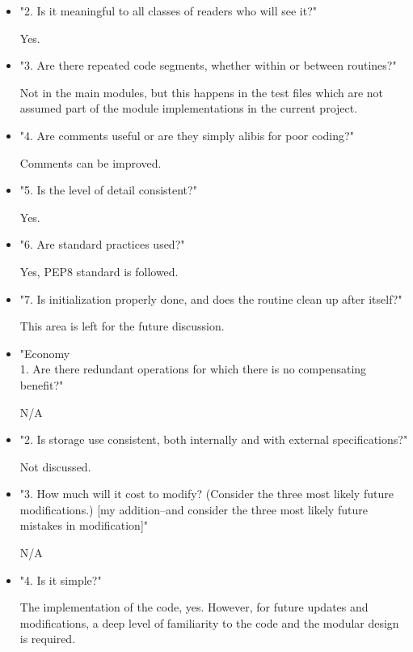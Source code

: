 \documentclass[12pt, titlepage]{article}
\begin{document}
\begin{itemize}
	\item "2.  Is it meaningful to all classes of readers who will see it?"
	
	\subitem Yes.
	
	\item "3.  Are there repeated code segments, whether within or between
	routines?"
	
	\subitem Not in the main modules, but this happens in the test files which are not assumed part of the module implementations in the current project.
	
	\item "4.  Are comments useful or are they simply alibis for poor coding?"
	
	\subitem Comments can be improved. 
	
	\item "5.  Is the level of detail consistent?"
	
	\subitem Yes.
	
	\item "6.  Are standard practices used?"
	
	\subitem Yes, PEP8 standard is followed.
	
	\item"7.  Is initialization properly done, and does the routine clean up
	after itself?"
	
	\subitem This area is left for the future discussion. 
	
	\item"Economy\\ 1.  Are there redundant operations for which there is no compensating
	benefit?"
	
	\subitem N/A
	
	\item "2.  Is storage use consistent, both internally and with external
	specifications?"
	
	\subitem Not discussed.
	
	\item"3.  How much will it cost to modify?  (Consider the three most likely
	future modifications.)  [my addition--and consider the three most
	likely future mistakes in modification]"
	
	\subitem N/A
	
	\item "4.  Is it simple?"
	
	\subitem The implementation of the code, yes. However, for future updates and modifications, a deep level of familiarity to the code and the modular design is required.
	
\end{itemize}
\end{document}
